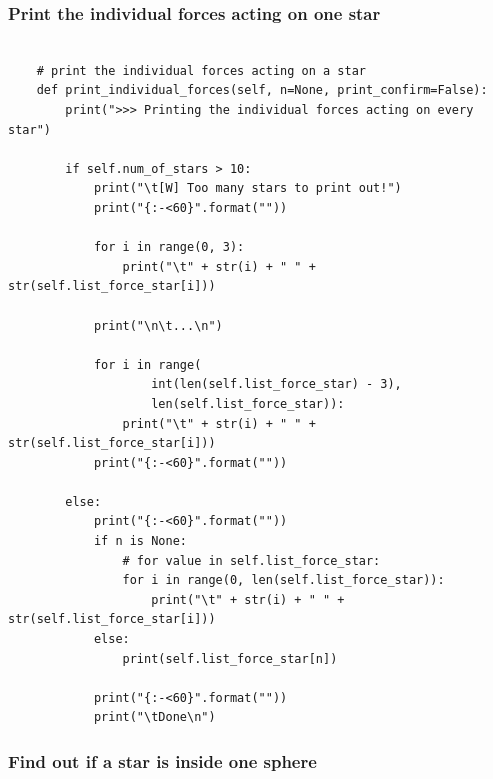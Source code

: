 \subsubsection{Print the individual forces acting on one star}

\begin{lstlisting}

    # print the individual forces acting on a star
    def print_individual_forces(self, n=None, print_confirm=False):
        print(">>> Printing the individual forces acting on every star")

        if self.num_of_stars > 10:
            print("\t[W] Too many stars to print out!")
            print("{:-<60}".format(""))

            for i in range(0, 3):
                print("\t" + str(i) + " " + str(self.list_force_star[i]))

            print("\n\t...\n")

            for i in range(
                    int(len(self.list_force_star) - 3),
                    len(self.list_force_star)):
                print("\t" + str(i) + " " + str(self.list_force_star[i]))
            print("{:-<60}".format(""))

        else:
            print("{:-<60}".format(""))
            if n is None:
                # for value in self.list_force_star:
                for i in range(0, len(self.list_force_star)):
                    print("\t" + str(i) + " " + str(self.list_force_star[i]))
            else:
                print(self.list_force_star[n])

            print("{:-<60}".format(""))
            print("\tDone\n")

\end{lstlisting}

\subsubsection{Find out if a star is inside one sphere}

